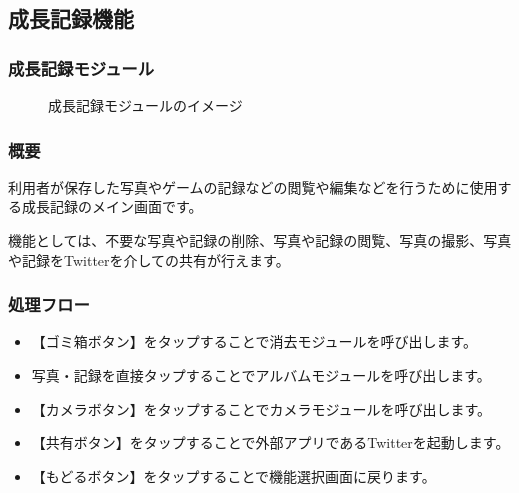 \documentclass[a4j]{jarticle}
\begin{document}
\subsection{成長記録機能}
\subsubsection{成長記録モジュール}
\begin{figure}[H]
    \begin{center}
    \caption {成長記録モジュールのイメージ}
    \label{functionselection}
    \end{center}
\end{figure}


\subsubsection*{概要}
利用者が保存した写真やゲームの記録などの閲覧や編集などを行うために使用する成長記録のメイン画面です。

機能としては、不要な写真や記録の削除、写真や記録の閲覧、写真の撮影、写真や記録をTwitterを介しての共有が行えます。

\subsubsection*{処理フロー}
\begin{itemize}
\item 【ゴミ箱ボタン】をタップすることで消去モジュールを呼び出します。

\item 写真・記録を直接タップすることでアルバムモジュールを呼び出します。

\item 【カメラボタン】をタップすることでカメラモジュールを呼び出します。

\item 【共有ボタン】をタップすることで外部アプリであるTwitterを起動します。

\item 【もどるボタン】をタップすることで機能選択画面に戻ります。
\end{itemize}
\end{document}

